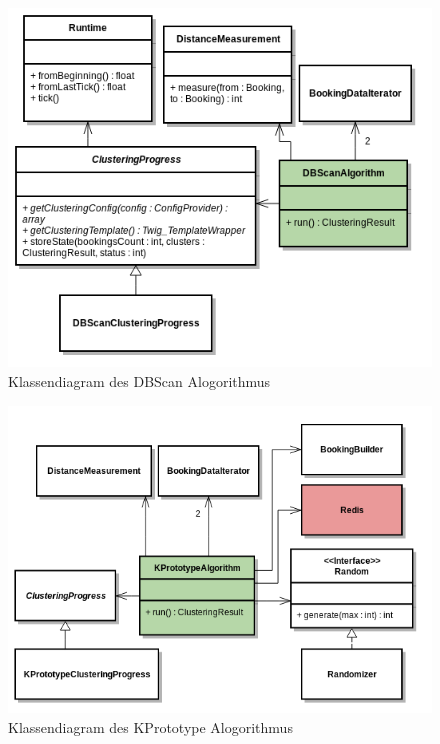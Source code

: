 \begin{figure}[H]
	\centering
	\includegraphics[width=1\textwidth]{images/diagram-class-DBScanAlgorithm}
	\caption{Klassendiagram des DBScan Alogorithmus}
	\label{fig:proofofconcept:klassenstruktur:3}
\end{figure}
\begin{figure}[H]
	\centering
	\includegraphics[width=1\textwidth]{images/diagram-class-KPrototypeAlgorithm}
	\caption{Klassendiagram des KPrototype Alogorithmus}
	\label{fig:proofofconcept:klassenstruktur:4}
\end{figure}